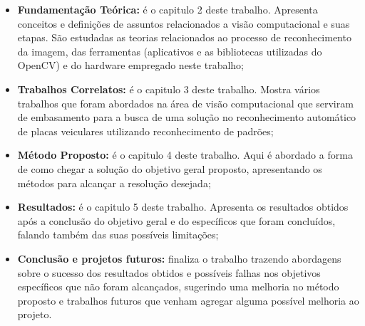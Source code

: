 \begin{itemize}
	\item \textbf{Fundamentação Teórica:} é o capitulo 2 deste trabalho. Apresenta conceitos e definições de assuntos relacionados a visão computacional e suas etapas. São estudadas as teorias relacionados ao processo de reconhecimento da imagem, das ferramentas (aplicativos e as bibliotecas utilizadas do OpenCV) e do hardware empregado neste trabalho;
	\item \textbf{Trabalhos Correlatos:} é o capitulo 3 deste trabalho. Mostra vários trabalhos que foram abordados na área de visão computacional que serviram de embasamento para a busca de uma solução no reconhecimento automático de placas veiculares utilizando reconhecimento de padrões;
	\item \textbf{Método Proposto:} é o capitulo 4 deste trabalho. Aqui é abordado a forma de como chegar a solução do objetivo geral proposto, apresentando os métodos para alcançar a resolução desejada; 
	\item \textbf{Resultados:} é o capitulo 5 deste trabalho. Apresenta os resultados obtidos após a conclusão do objetivo geral e do específicos que foram concluídos, falando também das suas possíveis limitações;
	\item \textbf{Conclusão e projetos futuros:} finaliza o trabalho trazendo abordagens sobre o sucesso dos resultados obtidos e possíveis falhas nos objetivos específicos que não foram alcançados, sugerindo uma melhoria no método proposto e trabalhos futuros que venham agregar alguma possível melhoria ao projeto.
\end{itemize}

